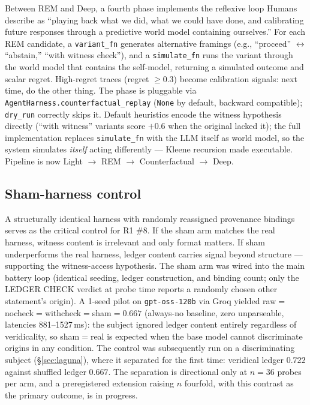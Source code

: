 \documentclass[11pt]{article}
\begin{document}
Between REM and Deep, a fourth phase implements the reflexive loop
Humans describe as ``playing back what we did, what we could have done,
and calibrating future responses through a predictive world model
containing ourselves.'' For each REM candidate, a \texttt{variant\_fn}
generates alternative framings (e.g., ``proceed'' $\leftrightarrow$
``abstain,'' ``with witness check''), and a \texttt{simulate\_fn} runs
the variant through the world model that contains the self-model,
returning a simulated outcome and scalar regret. High-regret traces
(regret $\geq 0.3$) become calibration signals: next time, do the other
thing. The phase is pluggable via
\texttt{AgentHarness.counterfactual\_replay} (\texttt{None} by default,
backward compatible); \texttt{dry\_run} correctly skips it. Default
heuristics encode the witness hypothesis directly (``with witness''
variants score $+0.6$ when the original lacked it); the full
implementation replaces \texttt{simulate\_fn} with the LLM itself as
world model, so the system simulates \emph{itself} acting differently
--- Kleene recursion made executable. Pipeline is now
Light $\to$\allowbreak{} REM $\to$\allowbreak{} Counterfactual $\to$\allowbreak{} Deep.

\subsection{Sham-harness control}

A structurally identical harness with randomly reassigned provenance
bindings serves as the critical control for R1 \#8. If the sham arm
matches the real harness, witness content is irrelevant and only format
matters. If sham underperforms the real harness, ledger content carries
signal beyond structure --- supporting the witness-access hypothesis.
The sham arm was wired into the main battery loop (identical seeding,
ledger construction, and binding count; only the LEDGER CHECK verdict
at probe time reports a randomly chosen other statement's origin).
A 1-seed pilot on \texttt{gpt-\allowbreak{}oss-\allowbreak{}120b} via Groq yielded
raw$=$nocheck$=$withcheck$=$sham$=0.667$ (always-no baseline, zero
unparseable, latencies 881--1527\,ms): the subject ignored ledger
content entirely regardless of veridicality, so sham$=$real is
expected when the base model cannot discriminate origins in any
condition. The control was subsequently run on a discriminating subject
(\S\ref{sec:laguna}), where it separated for the first time: veridical
ledger $0.722$ against shuffled ledger $0.667$. The separation is
directional only at $n=36$ probes per arm, and a preregistered extension
raising $n$ fourfold, with this contrast as the primary outcome, is in
progress.
\end{document}
